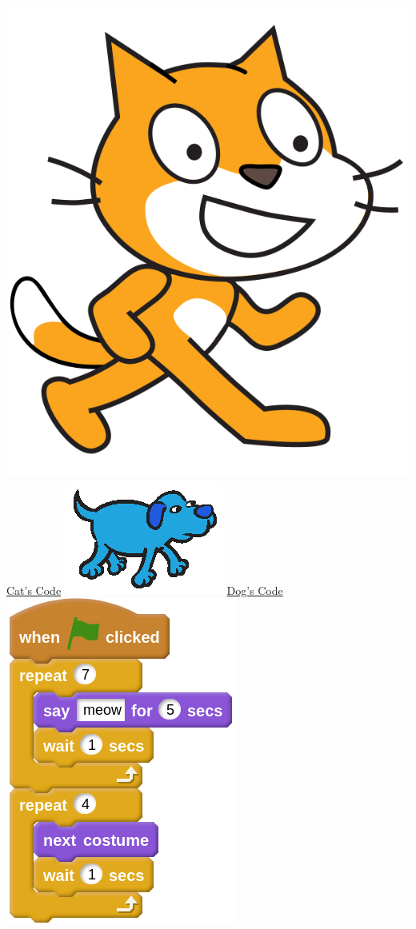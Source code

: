 \documentclass[letterpaper,12pt]{article}
\begin{document}
\indent \includegraphics[scale=.45,valign=c]{cat.png} \underline{Cat's Code} \hspace{5cm}
\includegraphics[scale=.2,valign=c]{dog.png} \underline{Dog's Code} \\
\includegraphics[scale=.4,valign=t]{q5_script0.png} \hspace{1cm}
\end{document}
